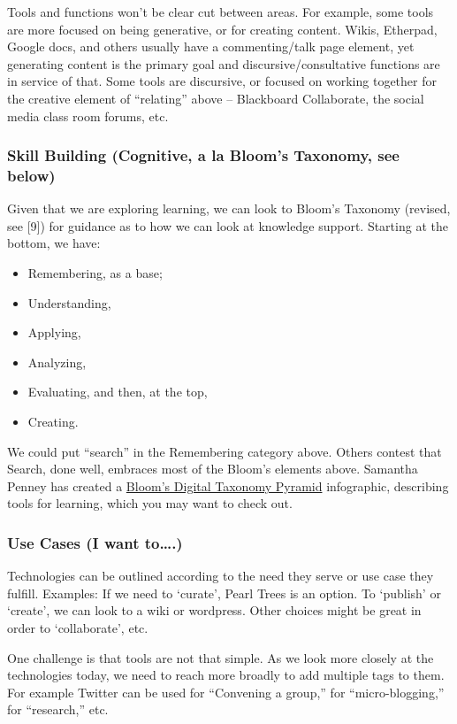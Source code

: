 Tools and functions won't be clear cut between areas. For example, some
tools are more focused on being generative, or for creating content.
Wikis, Etherpad, Google docs, and others usually have a commenting/talk
page element, yet generating content is the primary goal and
discursive/consultative functions are in service of that. Some tools are
discursive, or focused on working together for the creative element of
``relating'' above -- Blackboard Collaborate, the social media class
room forums, etc.

\subsubsection{Skill Building (Cognitive, a la Bloom's Taxonomy, see
below)}

Given that we are exploring learning, we can look to Bloom's Taxonomy
(revised, see {[}9{]}) for guidance as to how we can look at knowledge
support. Starting at the bottom, we have:

\begin{itemize}[noitemsep]
\item
  Remembering, as a base;
\item
  Understanding,
\item
  Applying,
\item
  Analyzing,
\item
  Evaluating, and then, at the top,
\item
  Creating.
\end{itemize}
We could put ``search'' in the Remembering category above. Others
contest that Search, done well, embraces most of the Bloom's elements
above. Samantha Penney has created a
\href{http://www.usi.edu/distance/bdt.htm}{Bloom's Digital Taxonomy
Pyramid} infographic, describing tools for learning, which you may want
to check out.

\subsubsection{Use Cases (I want to\ldots{}.)}

Technologies can be outlined according to the need they serve or use
case they fulfill. Examples: If we need to `curate', Pearl Trees is an
option. To `publish' or `create', we can look to a wiki or wordpress.
Other choices might be great in order to `collaborate', etc.

One challenge is that tools are not that simple. As we look more closely
at the technologies today, we need to reach more broadly to add multiple
tags to them. For example Twitter can be used for ``Convening a group,''
for ``micro-blogging,'' for ``research,'' etc.

